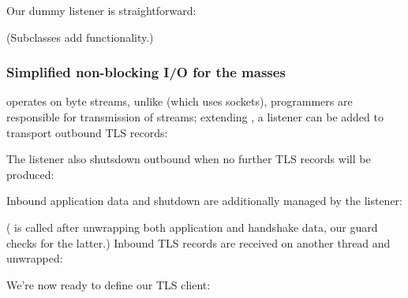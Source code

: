 

\noindent
Our dummy listener is straightforward:



\noindent
(Subclasses add functionality.)



\subsubsection{Simplified non-blocking I/O for the masses}\label{sec:SSLEngine:madeEasy}

 operates on byte streams, unlike  (which uses sockets), 
programmers are responsible for transmission of streams; extending , 
a listener can be added to transport outbound TLS records:



\noindent 
The listener also shutsdown outbound when no further TLS records will be produced:



\noindent
Inbound application data and shutdown are additionally managed by the listener:



\noindent
( is called after unwrapping both application and
handshake data, our guard checks for the latter.) 
%
Inbound TLS records are received on another thread and unwrapped:



\noindent
We're now ready to define our TLS client:



